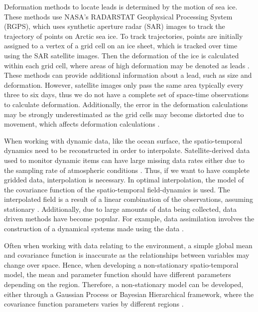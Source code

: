 \documentclass[12pt]{article}
\begin{document}
Deformation methods to locate leads is determined by the motion of sea
ice. These methods use NASA's RADARSTAT Geophysical Processing System
(RGPS), which uses synthetic aperture radar (SAR) images to track the
trajectory of points on Arctic sea ice. To track trajectories, points
are initially assigned to a vertex of a grid cell on an ice sheet, which
is tracked over time using the SAR satellite images. Then the
deformation of the ice is calculated within each grid cell, where areas
of high deformation may be denoted as leads
\citep{peterson_evaluating_2011}. These methods can provide additional
information about a lead, such as size and deformation. However,
satellite images only pass the same area typically every three to six
days, thus we do not have a complete set of space-time observations to
calculate deformation. Additionally, the error in the deformation
calculations may be strongly underestimated as the grid cells may become
distorted due to movement, which affects deformation calculations
\citep{bouillon_producing_2015}.

When working with dynamic data, like the ocean surface, the
spatio-temporal dynamics need to be reconstructed in order to
interpolate. Satellite-derived data used to monitor dynamic items can
have large missing data rates either due to the sampling rate of
atmospheric conditions \citep{fablet_data-driven_2017}. Thus, if we want
to have complete gridded data, interpolation is necessary. In optimal
interpolation, the model of the covariance function of the
spatio-temporal field-dynamics is used. The interpolated field is a
result of a linear combination of the observations, assuming stationary
\citep{fablet_data-drive_2017, ouala_neural_2018}. Additionally, due to
large amounts of data being collected, data driven methods have become
popular. For example, data assimilation involves the construction of a
dynamical systems made using the data
\citep{li_variational_2015, fablet_data-drive_2017, ouala_neural_2018}.

Often when working with data relating to the environment, a simple
global mean and covariance function is inaccurate as the relationships
between variables may change over space. Hence, when developing a
non-stationary spatio-temporal model, the mean and parameter function
should have different parameters depending on the region. Therefore, a
non-stationary model can be developed, either through a Gaussian Process
or Bayesian Hierarchical framework, where the covariance function
parameters varies by different regions
\citep{guinness_nonstationary_2013, SALVANA2020100411}.
\end{document}
